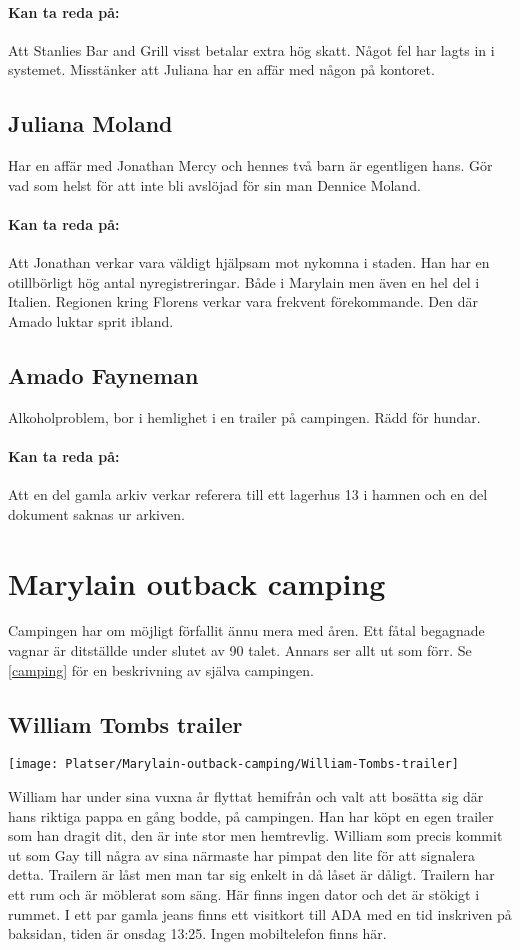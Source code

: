 \documentclass[a5paper,10pt]{report}
\begin{document}
\paragraph{Kan ta reda på:} Att Stanlies Bar and Grill visst betalar extra hög skatt. Något fel har lagts in i systemet. Misstänker att Juliana har en affär med någon på kontoret.
\subsection{Juliana Moland}
Har en affär med Jonathan Mercy och hennes två barn är egentligen hans. Gör vad som helst för att inte bli avslöjad för sin man Dennice Moland.
\paragraph{Kan ta reda på:} Att Jonathan verkar vara väldigt hjälpsam mot nykomna i staden. Han har en otillbörligt hög antal nyregistreringar. Både i Marylain men även en hel del i Italien. Regionen kring Florens verkar vara frekvent förekommande. Den där Amado luktar sprit ibland.
\subsection{Amado Fayneman}
Alkoholproblem, bor i hemlighet i en trailer på campingen. Rädd för hundar.
\paragraph{Kan ta reda på:} Att en del gamla arkiv verkar referera till ett lagerhus 13 i hamnen och en del dokument saknas ur arkiven.
\clearpage
\section{Marylain outback camping}
Campingen har om möjligt förfallit ännu mera med åren. Ett fåtal begagnade vagnar är ditställde under slutet av 90 talet. Annars ser allt ut som förr. Se \ref{camping} för en beskrivning av själva campingen.
\subsection{William Tombs trailer}
\texttt{[image: Platser/Marylain-outback-camping/William-Tombs-trailer]}

William har under sina vuxna år flyttat hemifrån och valt att bosätta sig där hans riktiga pappa en gång bodde, på campingen. Han har köpt en egen trailer som han dragit dit, den är inte stor men hemtrevlig. William som precis kommit ut som Gay till några av sina närmaste har pimpat den lite för att signalera detta. Trailern är låst men man tar sig enkelt in då låset är dåligt. Trailern har ett rum och är möblerat som säng. Här finns ingen dator och det är stökigt i rummet. I ett par gamla jeans finns ett visitkort till ADA med en tid inskriven på baksidan, tiden är onsdag 13:25. Ingen mobiltelefon finns här.
\clearpage
\end{document}
